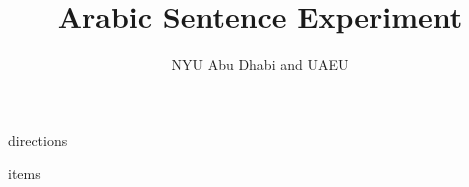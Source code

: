 \documentclass[11pt, a4paper]{article}
\begin{document}
	\title{Arabic Sentence Experiment}
	\author{NYU Abu Dhabi and UAEU}
	
	\maketitle
	
	{directions}
	
	\vfill\clearpage
	
	{items}



\vfill
\end{document}
